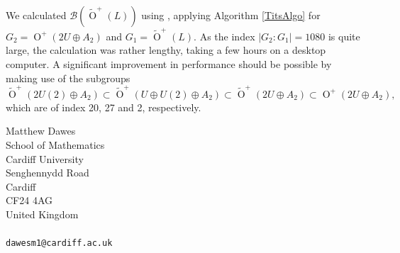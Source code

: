 \documentclass[12pt, a4paper]{article}
\newcommand{\ttt}{\texttt}
\newcommand{\beq}{\begin{equation*}}
\newcommand{\eeq}{\end{equation*}}
\newcommand{\bc}{\mathcal{B}}
\newcommand{\opn}{\operatorname}
\newcommand{\op}{\oplus}
\newcommand{\otl}{\widetilde{\opn{O}}^+(L)}
\begin{document}
We calculated $\bc(\otl)$ using \cite{boundary}, applying Algorithm \ref{TitsAlgo} for $G_2 = \opn{O}^+(2U \op A_2)$ and $G_1 = \otl$.
As the index $\vert G_2:G_1 \vert = 1080$ is quite large, the calculation was rather lengthy, taking a few hours on a desktop computer.
A significant  improvement in performance should be possible by making use of the subgroups
\beq
\widetilde{\opn{O}}^+(2U(2) \op A_2)
\subset
\widetilde{\opn{O}}^+(U \op U(2) \op A_2)
\subset
\widetilde{\opn{O}}^+(2U  \op A_2)
\subset
\opn{O}^+(2U \op A_2),
\eeq
which are of index
20, 27 and 2, respectively.
 \small{

{}
}
\bigskip
\noindent Matthew Dawes\\
School of Mathematics\\
Cardiff University\\
Senghennydd Road\\
Cardiff\\
CF24 4AG\\
United Kingdom\\
\\
\noindent \ttt{dawesm1@cardiff.ac.uk}
\end{document}
